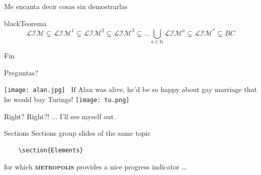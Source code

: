 \documentclass[10pt]{beamer}
\newcommand{\themename}{\textbf{\textsc{metropolis}}\xspace}
\begin{document}
\begin{frame}{Me encanta decir cosas sin demostrarlas}


\begin{mybox}{black}{Teorema}
$$\mathcal{LIM} \subsetneq \mathcal{LIM}^1 \subsetneq \mathcal{LIM}^2 \subsetneq \mathcal{LIM}^3 \subsetneq ... \bigcup\limits_{a \in \mathbb{N}} \mathcal{LIM}^a \subsetneq \mathcal{LIM}^* \subsetneq BC$$
\end{mybox}




\end{frame}


\begin{frame}{Fin}

Preguntas? \bigskip \bigskip


\texttt{[image: alan.jpg]}
\indent\ If Alan was alive, he'd be so happy about gay marriage that he would buy \color{orange}Tu\color{blue}rings\color{black}!
\texttt{[image: tu.png]}

Right? Right?! ... I'll see myself out.

\end{frame}
















\iffalse

\begin{frame}[fragile]{Sections}
  Sections group slides of the same topic

  \begin{verbatim}    \section{Elements}\end{verbatim}

  for which \themename provides a nice progress indicator \ldots
\end{frame}
\end{document}
